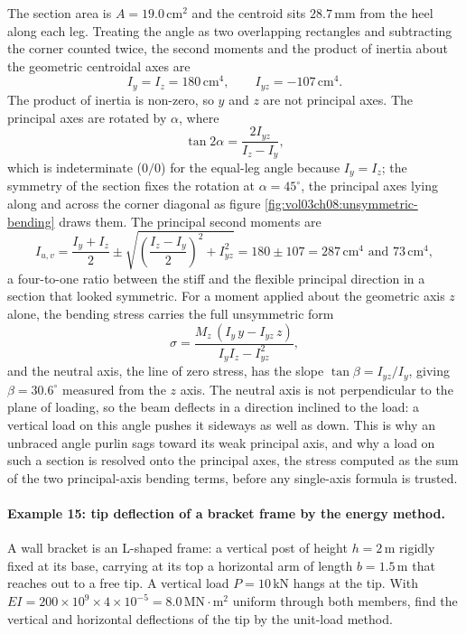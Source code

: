 The section area is $A = 19.0\,\text{cm}^2$ and the centroid sits
$28.7\,\si{\milli\meter}$ from the heel along each leg. Treating the
angle as two overlapping rectangles and subtracting the corner counted
twice, the second moments and the product of inertia about the geometric
centroidal axes are
\[
I_y = I_z = 180\,\text{cm}^4, \qquad I_{yz} = -107\,\text{cm}^4.
\]
The product of inertia is non-zero, so $y$ and $z$ are not principal
axes. The principal axes are rotated by $\alpha$, where
\[
\tan 2\alpha = \frac{2 I_{yz}}{I_z - I_y},
\]
which is indeterminate ($0/0$) for the equal-leg angle because $I_y =
I_z$; the symmetry of the section fixes the rotation at $\alpha =
45^{\circ}$, the principal axes lying along and across the corner
diagonal as figure \ref{fig:vol03ch08:unsymmetric-bending} draws them.
The principal second moments are
\[
I_{u,v} = \frac{I_y + I_z}{2} \pm \sqrt{\left(\frac{I_z - I_y}{2}\right)^2
+ I_{yz}^2}
= 180 \pm 107 = 287\,\text{cm}^4 \text{ and } 73\,\text{cm}^4,
\]
a four-to-one ratio between the stiff and the flexible principal
direction in a section that looked symmetric. For a moment applied about
the geometric axis $z$ alone, the bending stress carries the full
unsymmetric form
\[
\sigma = \frac{M_z\,(I_y\,y - I_{yz}\,z)}{I_y I_z - I_{yz}^2},
\]
and the neutral axis, the line of zero stress, has the slope $\tan\beta =
I_{yz}/I_y$, giving $\beta = 30.6^{\circ}$ measured from the $z$ axis.
The neutral axis is not perpendicular to the plane of loading, so the
beam deflects in a direction inclined to the load: a vertical load on
this angle pushes it sideways as well as down. This is why an unbraced
angle purlin sags toward its weak principal axis, and why a load on such
a section is resolved onto the principal axes, the stress computed as the
sum of the two principal-axis bending terms, before any single-axis
formula is trusted.

\paragraph{Example 15: tip deflection of a bracket frame by the energy
method.} A wall bracket is an L-shaped frame: a vertical post of height
$h = 2\,\si{\meter}$ rigidly fixed at its base, carrying at its top a
horizontal arm of length $b = 1.5\,\si{\meter}$ that reaches out to a
free tip. A vertical load $P = 10\,\text{kN}$ hangs at the tip. With
$EI = 200 \times 10^9 \times 4 \times 10^{-5} = 8.0\,\text{MN}\cdot
\si{\meter\squared}$ uniform through both members, find the vertical and
horizontal deflections of the tip by the unit-load method.

